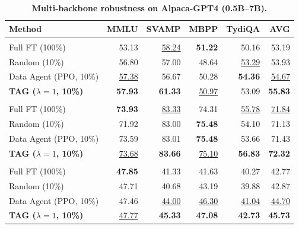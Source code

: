 
\begin{table}[t]
\centering
\caption{\textbf{Multi-backbone robustness on Alpaca-GPT4 (0.5B--7B).}}
\label{tab:backbone-robustness}
{\fontsize{8pt}{11pt}\selectfont
\setlength{\tabcolsep}{3pt}
\begin{tabularx}{\columnwidth}{@{}Yrrrrr@{}}
\toprule
Method & MMLU & SVAMP & MBPP & TydiQA & AVG \\
\midrule
{}
 \\
Full FT (100\%)        & 53.13              & \underline{58.24} & \textbf{51.22}     & 50.16              & 53.19 \\
Random (10\%)          & 56.80              & 57.00              & 48.64              & \underline{53.29}  & 53.93 \\
Data Agent (PPO, 10\%) & \underline{57.38}  & 56.67              & 50.28              & \textbf{54.36}     & \underline{54.67} \\
\textbf{\textsc{TAG} ($\lambda{=}1$, 10\%)} & \textbf{57.93} & \textbf{61.33} & \underline{50.97} & 53.09 & \textbf{55.83} \\
\addlinespace[3pt]

 \\
Full FT (100\%)        & \textbf{73.93}     & \underline{83.33} & 74.31              & \underline{55.78}  & \underline{71.84} \\
Random (10\%)          & 71.92              & 83.00              & \textbf{75.48}     & 54.10              & 71.13 \\
Data Agent (PPO, 10\%) & 73.59              & 83.01              & \textbf{75.48}     & 53.66              & 71.43 \\
\textbf{\textsc{TAG} ($\lambda{=}1$, 10\%)} & \underline{73.68} & \textbf{83.66} & \underline{75.10} & \textbf{56.83} & \textbf{72.32} \\
\addlinespace[3pt]

 \\
Full FT (100\%)        & \textbf{47.85}     & 41.33              & 41.63              & 40.27              & 42.77 \\
Random (10\%)          & 47.71              & 40.68              & 43.19              & 39.88              & 42.87 \\
Data Agent (PPO, 10\%) & 47.46              & \underline{44.00} & \underline{46.30} & \underline{41.04} & \underline{44.70} \\
\textbf{\textsc{TAG} ($\lambda{=}1$, 10\%)} & \underline{47.77} & \textbf{45.33} & \textbf{47.08} & \textbf{42.73} & \textbf{45.73} \\
\bottomrule
\end{tabularx}
}
\end{table}

